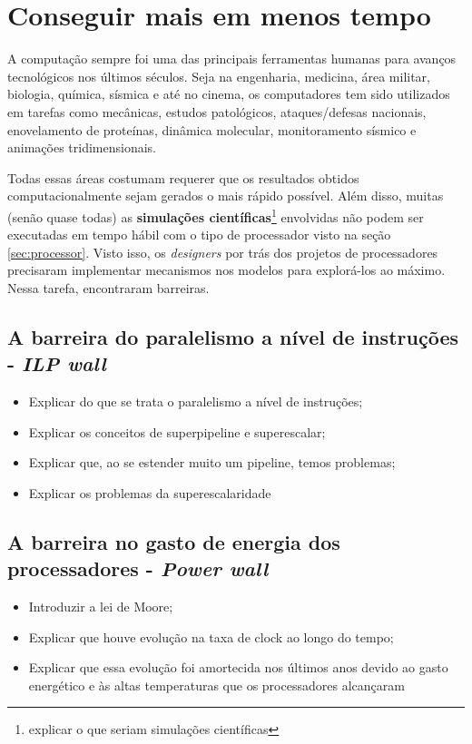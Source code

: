\section{Conseguir mais em menos tempo}

	A computação sempre foi uma das principais ferramentas humanas para avanços 
	tecnológicos nos últimos séculos. Seja na engenharia, medicina, área 
	militar, biologia, química, sísmica e até no cinema, os computadores tem 
	sido utilizados em tarefas como mecânicas, estudos patológicos, 
	ataques/defesas nacionais, enovelamento de proteínas, dinâmica molecular, 
	monitoramento sísmico e animações tridimensionais.
	
	Todas essas áreas costumam requerer que os resultados obtidos 
	computacionalmente sejam gerados o mais rápido possível. Além disso, 
	muitas (senão quase todas) as \textbf{simulações científicas}\footnote{
		explicar o que seriam simulações científicas}
	envolvidas não podem ser executadas em tempo hábil com o tipo de processador
	visto na seção \ref{sec:processor}. Visto 
	isso, os \textit{designers} por trás dos projetos de processadores precisaram 
	implementar mecanismos nos modelos para explorá-los ao máximo. Nessa tarefa, 
	encontraram barreiras.
    
    \subsection{A barreira do paralelismo a nível de instruções - \textit{ILP wall}}
    
        \begin{itemize}
            \item Explicar do que se trata o paralelismo a nível de instruções;
            \item Explicar os conceitos de superpipeline e superescalar;
            \item Explicar que, ao se estender muito um pipeline, temos problemas;
            \item Explicar os problemas da superescalaridade
        \end{itemize}
    
    \subsection{A barreira no gasto de energia dos processadores - \textit{Power wall}}
    
        \begin{itemize}
            \item Introduzir a lei de Moore;
            \item Explicar que houve evolução na taxa de clock ao longo do tempo;
            \item Explicar que essa evolução foi amortecida nos últimos anos devido 
            ao gasto energético e às altas temperaturas que os processadores alcançaram 
        \end{itemize}
    
